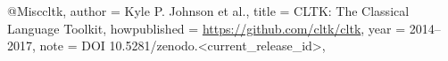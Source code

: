 @Misc{cltk,
	author = {Kyle P. Johnson et al.},
	title = {CLTK: The Classical Language Toolkit},
	howpublished = {\url{https://github.com/cltk/cltk}},
	year = {2014--2017},
	note = {{DOI} 10.5281/zenodo.<current_release_id>},
}
